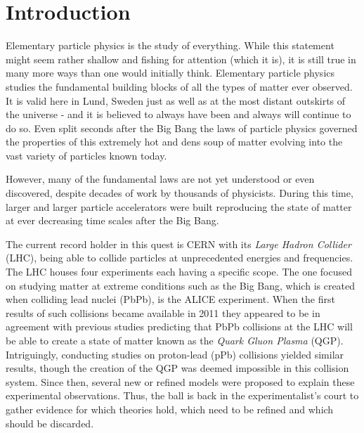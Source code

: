 \chapter{Introduction}
\label{sec:intro}

Elementary particle physics is the study of everything. While this statement might seem rather shallow and fishing for attention (which it is), it is still true in many more ways than one would initially think. Elementary particle physics studies the fundamental building blocks of all the types of matter ever observed. It is valid here in Lund, Sweden just as well as at the most distant outskirts of the universe - and it is believed to always have been and always will continue to do so. Even split seconds after the Big Bang the laws of particle physics governed the properties of this extremely hot and dens soup of matter evolving into the vast variety of particles known today.

However, many of the fundamental laws are not yet understood or even discovered, despite decades of work by thousands of physicists. During this time, larger and larger particle accelerators were built reproducing the state of matter at ever decreasing time scales after the Big Bang. 

The current record holder in this quest is CERN with its \emph{Large Hadron Collider} (LHC), being able to collide particles at unprecedented energies and frequencies. The LHC houses four experiments each having a specific scope. The one focused on studying matter at extreme conditions such as the Big Bang, which is created when colliding lead nuclei (PbPb), is the ALICE experiment. When the first results of such collisions became available in 2011 they appeared  to be in agreement with previous studies predicting that PbPb collisions at the LHC will be able to create a state of matter known as the \emph{Quark Gluon Plasma} (QGP).
Intriguingly, conducting studies on proton-lead (pPb) collisions yielded similar results, though the creation of the QGP was deemed impossible in this collision system.
Since then, several new or refined models were proposed to explain these experimental observations.
Thus, the ball is back in the experimentalist's court to gather evidence for which theories hold, which need to be refined and which should be discarded.

